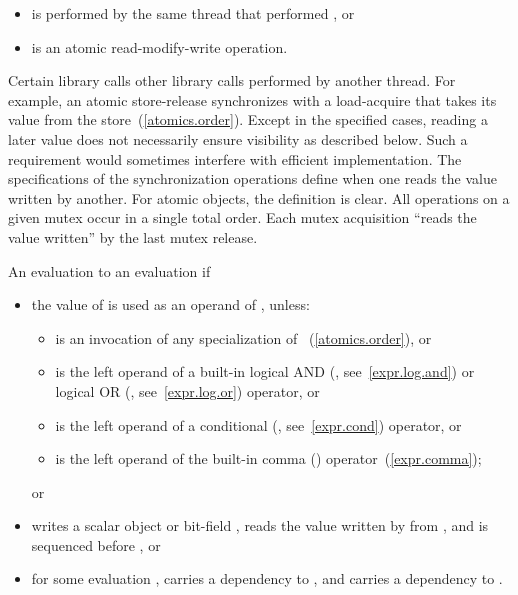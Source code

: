 \begin{itemize}
\item is performed by the same thread that performed , or
\item is an atomic read-modify-write operation.
\end{itemize}

\pnum
Certain library calls  other library calls performed by
another thread. For example, an atomic store-release synchronizes with a
load-acquire that takes its value from the store~(\ref{atomics.order}).
\enternote Except in the specified cases, reading a later value does not
necessarily ensure visibility as described below. Such a requirement would
sometimes interfere with efficient implementation. \exitnote \enternote The
specifications of the synchronization operations define when one reads the value
written by another. For atomic objects, the definition is clear. All operations
on a given mutex occur in a single total order. Each mutex acquisition ``reads
the value written'' by the last mutex release. \exitnote

\pnum
An evaluation   to an evaluation  if

\begin{itemize}

\item
the value of  is used as an operand of , unless:
\begin{itemize}

\item
{} is an invocation of any specialization of
~(\ref{atomics.order}), or

\item
{} is the left operand of a built-in logical AND (\tcode{\&\&},
see~\ref{expr.log.and}) or logical OR (\tcode{||}, see~\ref{expr.log.or}) 
operator, or

\item
{} is the left operand of a conditional (, see~\ref{expr.cond})
operator, or

\item
{} is the left operand of the built-in comma (\tcode{,})
operator~(\ref{expr.comma}); \end{itemize} or

\item
{} writes a scalar object or bit-field ,  reads the value
written by  from , and  is sequenced before , or

\item
for some evaluation ,  carries a dependency to , and 
 carries a dependency to .

\end{itemize}

